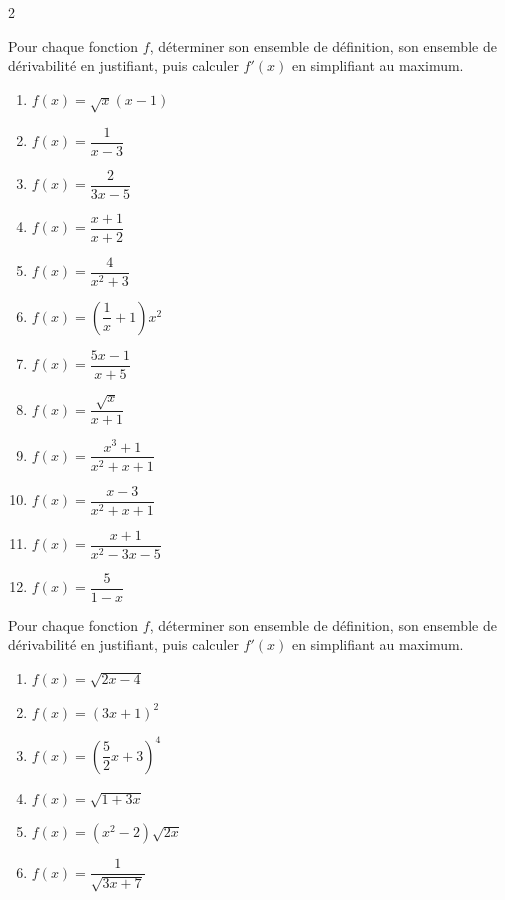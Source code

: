 \documentclass[a4paper,12pt]{article}
\begin{document}
\begin{multicols}{2}
\begin{exercice}[title=Exercice 14 $\quad \star \star \quad$ { [Calculer] }]{}{}
    Pour chaque fonction $f$, déterminer son ensemble de définition, son ensemble de dérivabilité en justifiant, puis calculer $f'(x)$ en simplifiant au maximum.
    \begin{enumerate}
        \item $f(x) = \sqrt{x}(x - 1)$
        \item $f(x) = \dfrac{1}{x - 3}$
        \item $f(x) = \dfrac{2}{3x - 5}$
        \item $f(x) = \dfrac{x + 1}{x + 2}$
        \item $f(x) = \dfrac{4}{x^2 + 3}$
        \item $f(x) = \left(\dfrac{1}{x} + 1\right)x^2$
        \item $f(x) = \dfrac{5x - 1}{x + 5}$
        \item $f(x) = \dfrac{\sqrt{x}}{x + 1}$
        \item $f(x) = \dfrac{x^3 + 1}{x^2 + x + 1}$
        \item $f(x) = \dfrac{x - 3}{x^2 + x + 1}$
        \item $f(x) = \dfrac{x + 1}{x^2 - 3x - 5}$
        \item $f(x) = \dfrac{5}{1 - x}$
    \end{enumerate}
    \end{exercice}
    
    \begin{exercice}[title=Exercice 15 $\quad \star \star \quad$ { [Calculer] }]{}{}
    Pour chaque fonction $f$, déterminer son ensemble de définition, son ensemble de dérivabilité en justifiant, puis calculer $f'(x)$ en simplifiant au maximum.
    \begin{enumerate}
        \item $f(x) = \sqrt{2x - 4}$
        \item $f(x) = (3x + 1)^2$
        \item $f(x) = \left(\dfrac{5}{2}x + 3\right)^4$
        \item $f(x) = \sqrt{1 + 3x}$
        \item $f(x) = (x^2 - 2)\sqrt{2x}$
        \item $f(x) = \dfrac{1}{\sqrt{3x + 7}}$
    \end{enumerate}
    \end{exercice}
    

\end{multicols}
\end{document}
